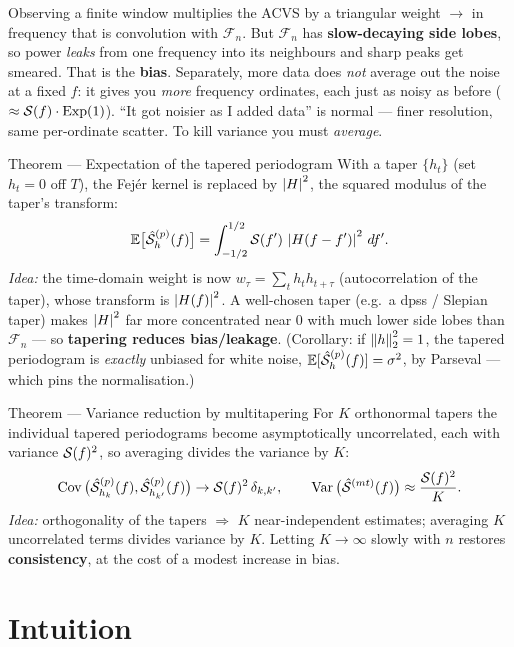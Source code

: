 \documentclass[11pt]{article}
\newcommand{\Fej}{\mathcal{F}}   %
\begin{document}
\begin{intu}
Observing a finite window multiplies the ACVS by a triangular weight $\to$ in frequency that is convolution with $\Fej_n$. But $\Fej_n$ has \textbf{slow-decaying side lobes}, so power \emph{leaks} from one frequency into its neighbours and sharp peaks get smeared. That is the \textbf{bias}. Separately, more data does \emph{not} average out the noise at a fixed $f$: it gives you \emph{more} frequency ordinates, each just as noisy as before ($\approx\mathcal{S}(f)\cdot\mathrm{Exp}(1)$). ``It got noisier as I added data'' is normal --- finer resolution, same per-ordinate scatter. To kill variance you must \emph{average}.
\end{intu}

\begin{result}{Theorem --- Expectation of the tapered periodogram}
With a taper $\{h_t\}$ (set $h_t=0$ off $T$), the Fej\'er kernel is replaced by $\left\lvert H \right\rvert^2$, the squared modulus of the taper's transform:
\[
\mathbb{E}\big[\hat{\mathcal{S}}^{(p)}_h(f)\big]
=\int_{-1/2}^{1/2}\mathcal{S}(f')\,\left\lvert H(f-f') \right\rvert^2\,df' .
\]
\textit{Idea:} the time-domain weight is now $w_\tau=\sum_t h_t h_{t+\tau}$ (autocorrelation of the taper), whose transform is $\left\lvert H(f) \right\rvert^2$. A well-chosen taper (e.g.\ a dpss / Slepian taper) makes $\left\lvert H \right\rvert^2$ far more concentrated near $0$ with much lower side lobes than $\Fej_n$ --- so \textbf{tapering reduces bias/leakage}. (Corollary: if $\left\lVert h \right\rVert_2^2=1$, the tapered periodogram is \emph{exactly} unbiased for white noise, $\mathbb{E}[\hat{\mathcal{S}}^{(p)}_h(f)]=\sigma^2$, by Parseval --- which pins the normalisation.)
\end{result}

\begin{result}{Theorem --- Variance reduction by multitapering}
For $K$ orthonormal tapers the individual tapered periodograms become asymptotically uncorrelated, each with variance $\mathcal{S}(f)^2$, so averaging divides the variance by $K$:
\[
\operatorname{Cov}\big(\hat{\mathcal{S}}^{(p)}_{h_k}(f),\hat{\mathcal{S}}^{(p)}_{h_{k'}}(f)\big)\to\mathcal{S}(f)^2\,\delta_{k,k'},
\qquad
\operatorname{Var}\big(\hat{\mathcal{S}}^{(mt)}(f)\big)\approx\frac{\mathcal{S}(f)^2}{K}.
\]
\textit{Idea:} orthogonality of the tapers $\Rightarrow$ $K$ near-independent estimates; averaging $K$ uncorrelated terms divides variance by $K$. Letting $K\to\infty$ slowly with $n$ restores \textbf{consistency}, at the cost of a modest increase in bias.
\end{result}

\section*{Intuition}
\end{document}
